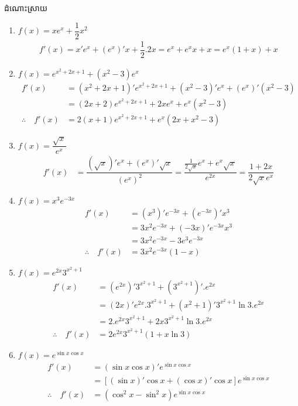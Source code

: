 \documentclass[12pt,fleqn]{book} %
\newcommand{\answer}{\begin{center}
\kml \color{magenta} ដំណោះស្រាយ
\end{center}}
\begin{document}
\answer 
\begin{enumerate}
\item $f(x)=xe^x +\dfrac{1}{2}x^2$
\begin{align*}
f'(x)=x' e^x +(e^x)'x+\dfrac{1}{2}.2x=e^x+e^xx +x=e^x(1+x)+x
\end{align*}
\item $f(x)=e^{x^2+2x+1}+(x^2-3)e^x$
\begin{align*}
f'(x)&=(x^2+2x+1)'e^{x^2+2x+1}+(x^2-3)'e^x+(e^x)'(x^2-3)\\
&=(2x+2)e^{x^2+2x+1}+2xe^x+e^x(x^2-3)\\
\therefore \quad f'(x)&=2(x+1)e^{x^2+2x+1}+e^x(2x+x^2-3)
\end{align*}
\item $f(x)=\dfrac{\sqrt{x}}{e^x}$
\begin{align*}
f'(x)&=\dfrac{(\sqrt{x})'e^x+(e^x)' \sqrt{x}}{(e^x)^2}=\dfrac{\frac{1}{2\sqrt{x}}e^x+e^x\sqrt{x}}{e^{2x}}=\dfrac{1+2x}{2\sqrt{x}e^x}
\end{align*}
\item $f(x)=x^3 e^{-3x}$
\begin{align*}
f'(x)&=(x^3)'e^{-3x}+(e^{-3x})'x^3\\
&=3x^2 e^{-3x}+(-3x)'e^{-3x}x^3\\
&=3x^2e^{-3x}-3e^3e^{-3x}\\
\therefore \quad f'(x)&=3x^2e^{-3x}(1-x)
\end{align*}
\item $f(x)=e^{2x}3^{x^2+1}$
\begin{align*}
f'(x)&=(e^{2x})'3^{x^2+1}+(3^{x^2+1})'.e^{2x}\\
&=(2x)'e^{2x}.3^{x^2+1}+(x^2+1)'3^{x^2+1}\ln 3 . e^{2x}\\
&=2.e^{2x}3^{x^2+1}+2x3^{x^2+1}\ln 3. e^{2x}\\
\therefore \quad f'(x)&=2e^{2x}3^{x^2+1}(1+x\ln 3)
\end{align*}
\item $f(x)=e^{\sin x\cos x}$
\begin{align*}
f'(x)&=(\sin x\cos x)'e^{\sin x\cos x}\\
&=[(\sin x)'\cos x+(\cos x)'\cos x]e^{\sin x\cos x}\\
\therefore \quad f'(x)&=(\cos^2 x-\sin^2 x)e^{\sin x\cos x}
\end{align*}
\end{enumerate}
\end{document}
